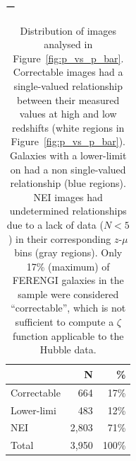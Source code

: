 \documentclass[twocolumn]{aastex6}
\begin{document}
\begin{table}ー
\caption{Distribution of \ferengi{} images analysed in Figure~\ref{fig:p_vs_p_bar}. Correctable images had a single-valued relationship between their measured \pbar{} values at high and low redshifts (white regions in Figure~\ref{fig:p_vs_p_bar}). Galaxies with a lower-limit on \pbar{} had a non single-valued relationship (blue regions). NEI images had undetermined relationships due to a lack of data ($N<5$) in their corresponding $z$-$\mu$ bins (gray regions). Only 17\% (maximum) of FERENGI galaxies in the sample were considered ``correctable'', which is not sufficient to compute a $\zeta$ function applicable to the Hubble data.   \label{tbl:ferengi_bar_corrections}}
\begin{tabular}{lrr}
\hline \hline
				                   & N       & \% \\
\hline 
Correctable                        & 664   & 17\% \\
Lower-limi                         & 483   & 12\% \\
NEI                                & 2,803     & 71\%\\
Total                              & 3,950   & 100\% \\
\hline \hline
\end{tabular}
\end{table}
\end{document}
